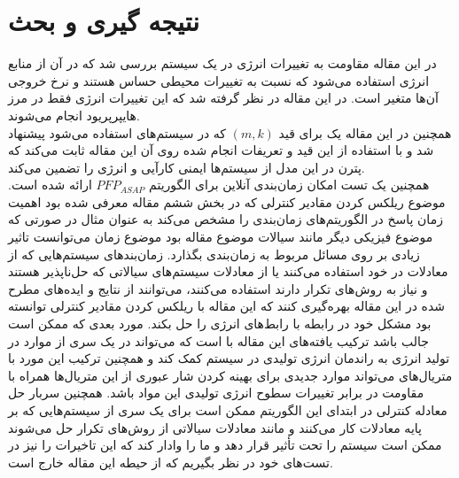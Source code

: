 \documentclass[a4paper, 11pt]{article}
\begin{document}
\section{نتیجه گیری و بحث}
در این مقاله مقاومت به تغییرات انرژی در یک سیستم
بررسی شد که در آن از منابع انرژی استفاده می‌شود که نسبت به تغییرات محیطی حساس هستند
و نرخ خروجی آن‌ها متغیر است. در این مقاله در نظر گرفته شد که این تغییرات انرژی فقط در مرز
هایپرپریود انجام می‌شوند. \\
همچنین در این مقاله یک
برای قید
$(m,k)$
که در سیستم‌های
استفاده می‌شود پیشنهاد شد و با استفاده از این قید و تعریفات انجام شده روی آن
این مقاله ثابت می‌کند که پترن
در این مدل از سیستم‌ها ایمنی کارآیی و انرژی را تضمین می‌کند. \\
همچنین یک تست امکان زمان‌بندی آنلاین برای الگوریتم
$PFP_{ASAP}$
ارائه شده است.
موضوع ریلکس کردن مقادیر کنترلی که در بخش ششم مقاله معرفی شده بود
اهمیت زمان پاسخ در الگوریتم‌های زمان‌بندی را مشخص می‌کند به عنوان مثال در صورتی که موضوع
فیزیکی دیگر مانند سیالات موضوع مقاله بود موضوع زمان می‌توانست تاثیر زیادی بر روی مسائل مربوط
به زمان‌بندی بگذارد. زمان‌بند‌های سیستم‌هایی که از معادلات
در خود استفاده می‌کنند یا از معادلات سیستم‌های سیالاتی که حل‌ناپذیر هستند و نیاز به روش‌های
تکرار دارند استفاده می‌کنند، می‌توانند از نتایج و ایده‌های مطرح شده در این مقاله بهره‌گیری کنند که
این مقاله با ریلکس کردن مقادیر کنترلی توانسته بود مشکل خود در رابطه با رابط‌های انرژی را حل بکند.
مورد بعدی که ممکن است جالب باشد ترکیب یافته‌های این مقاله با
است که می‌تواند در یک سری از موارد
در تولید انرژی به راندمان انرژی تولیدی در سیستم کمک کند و همچنین ترکیب این مورد
با متریال‌های
می‌تواند موارد جدیدی برای بهینه کردن شار عبوری از این متریال‌ها همراه با مقاومت در برابر تغییرات
سطوح انرژی تولیدی این مواد باشد.
همچنین سربار حل معادله کنترلی در ابتدای این الگوریتم ممکن است برای یک سری از سیستم‌هایی
که بر پایه معادلات
کار می‌کنند و مانند معادلات سیالاتی از روش‌های تکرار حل می‌شوند ممکن است سیستم را تحت تأثیر
قرار دهد و ما را وادار کند که این تاخیرات را نیز در تست‌های خود در نظر بگیریم که از حیطه این مقاله
خارج است.


\end{document}
